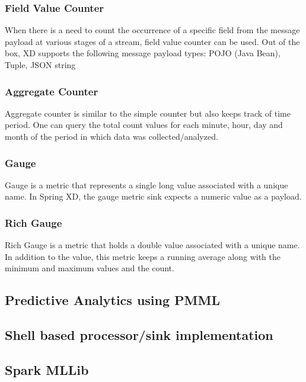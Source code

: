 \subsubsection {Field Value Counter} 

When there is a need to count the occurrence of a specific field from the message 
payload at various stages of a stream, field value counter can be used. Out of the box, 
XD supports the following message payload types:
POJO (Java Bean), Tuple, JSON string

\subsubsection {Aggregate Counter}

Aggregate counter is similar to the simple counter but also keeps track of time period. 
One can query the total count values for each minute, hour, day and month of the period in 
which data was collected/analyzed. 

\subsubsection {Gauge}
Gauge is a metric that represents a single long value associated with a unique name. 
In Spring XD, the gauge metric sink expects a numeric value as a payload.

\subsubsection {Rich Gauge}
Rich Gauge is a metric that holds a double value associated with a unique name. In 
addition to the value, this metric keeps a running average along with the minimum and 
maximum values and the count.

\subsection {Predictive Analytics using PMML}

\subsection {Shell based processor/sink implementation}

\subsection{Spark MLLib}

